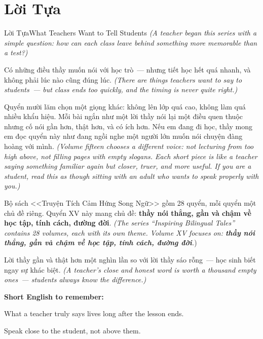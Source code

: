 \chapter*{Lời Tựa}

\begin{truyen}{Lời Tựa}{What Teachers Want to Tell Students}
\textit{(A teacher began this series with a simple question: how can each class leave behind something more memorable than a test?)}

Có những điều thầy muốn nói với học trò~--- nhưng tiết học hết quá nhanh, và không phải lúc nào cũng đúng lúc.
\textit{(There are things teachers want to say to students~--- but class ends too quickly, and the timing is never quite right.)}

Quyển mười lăm chọn một giọng khác: không lên lớp quá cao, không làm quá nhiều khẩu hiệu. Mỗi bài ngắn như một lời thầy nói lại một điều quen thuộc nhưng cố nói gần hơn, thật hơn, và có ích hơn. Nếu em đang đi học, thầy mong em đọc quyển này như đang ngồi nghe một người lớn muốn nói chuyện đàng hoàng với mình.
\textit{(Volume fifteen chooses a different voice: not lecturing from too high above, not filling pages with empty slogans. Each short piece is like a teacher saying something familiar again but closer, truer, and more useful. If you are a student, read this as though sitting with an adult who wants to speak properly with you.)}

Bộ sách <<Truyện Tích Cảm Hứng Song Ngữ>> gồm 28 quyển, mỗi quyển một chủ đề riêng. Quyển XV này mang chủ đề: \textbf{thầy nói thẳng, gần và chậm về học tập, tính cách, đường đời}.
\textit{(The series ``Inspiring Bilingual Tales'' contains 28 volumes, each with its own theme. Volume XV focuses on: \textbf{thầy nói thẳng, gần và chậm về học tập, tính cách, đường đời}.})
\end{truyen}

\begin{baihoc}
Lời thầy gần và thật hơn một nghìn lần so với lời thầy sáo rỗng~--- học sinh biết ngay sự khác biệt.
\textit{(A teacher's close and honest word is worth a thousand empty ones~--- students always know the difference.)}
\end{baihoc}

\begin{ghinhoanh}
\textbf{Short English to remember:}

What a teacher truly says lives long after the lesson ends.

Speak close to the student, not above them.
\end{ghinhoanh}

